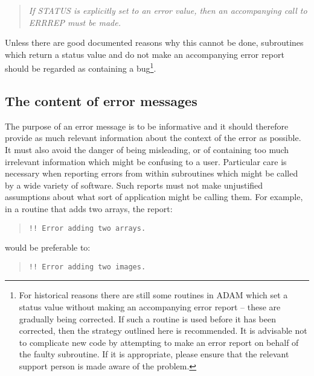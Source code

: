 \documentclass[twoside,11pt]{article}
\newcommand{\xlabel}[1]{}
\renewcommand{\_}{\texttt{\symbol{95}}}
\begin{document}
\begin {quote}
\emph{If STATUS is explicitly set to an error value, then an accompanying
call to ERR\_REP \emph{must} be made.} 
\end {quote}

Unless there are good documented reasons why this cannot be done,
subroutines which return a status value and do not make an accompanying
error report should be regarded as containing a bug\footnote{For historical
reasons there are still some routines in ADAM which
set a status value without making an accompanying error report -- these are
gradually being corrected. 
If such a routine is used before it has been corrected, then the strategy 
outlined here is recommended.
It is advisable not to complicate new code by attempting to make an error
report on behalf of the faulty subroutine.
If it is appropriate, please ensure that the relevant support person is made
aware of the problem.}.

\subsection{\xlabel{the_content_of_error_messages}The content of error messages}

The purpose of an error message is to be informative and it should
therefore provide as much relevant information about the context of the
error as possible.
It must also avoid the danger of being misleading, or of containing
too much irrelevant information which might be confusing to a user. 
Particular care is necessary when reporting errors from within subroutines
which might be called by a wide variety of software.
Such reports must not make unjustified assumptions about what sort of 
application might be calling them.
For example, in a routine that adds two arrays, the report:

\begin {quote}
\begin {small}
\begin{verbatim}
!! Error adding two arrays.
\end{verbatim}
\end {small}
\end {quote}

would be preferable to:

\begin {quote}
\begin {small}
\begin{verbatim}
!! Error adding two images.
\end{verbatim}
\end {small}
\end {quote}
\end{document}
